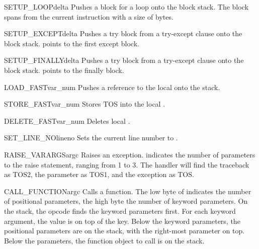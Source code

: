 \begin{opcodedesc}{SETUP_LOOP}{delta}
Pushes a block for a loop onto the block stack.  The block spans
from the current instruction with a size of  bytes.
\end{opcodedesc}

\begin{opcodedesc}{SETUP_EXCEPT}{delta}
Pushes a try block from a try-except clause onto the block stack.
 points to the first except block.
\end{opcodedesc}

\begin{opcodedesc}{SETUP_FINALLY}{delta}
Pushes a try block from a try-except clause onto the block stack.
 points to the finally block.
\end{opcodedesc}

\begin{opcodedesc}{LOAD_FAST}{var_num}
Pushes a reference to the local  onto
the stack.
\end{opcodedesc}

\begin{opcodedesc}{STORE_FAST}{var_num}
Stores TOS into the local .
\end{opcodedesc}

\begin{opcodedesc}{DELETE_FAST}{var_num}
Deletes local .
\end{opcodedesc}

\begin{opcodedesc}{SET_LINE_NO}{lineno}
Sets the current line number to .
\end{opcodedesc}

\begin{opcodedesc}{RAISE_VARARGS}{argc}
Raises an exception.  indicates the number of parameters
to the raise statement, ranging from 1 to 3.  The handler will find
the traceback as TOS2, the parameter as TOS1, and the exception
as TOS.
\end{opcodedesc}

\begin{opcodedesc}{CALL_FUNCTION}{argc}
Calls a function.  The low byte of  indicates the number of
positional parameters, the high byte the number of keyword parameters.
On the stack, the opcode finds the keyword parameters first.  For each
keyword argument, the value is on top of the key.  Below the keyword
parameters, the positional parameters are on the stack, with the
right-most parameter on top.  Below the parameters, the function object
to call is on the stack.
\end{opcodedesc}

